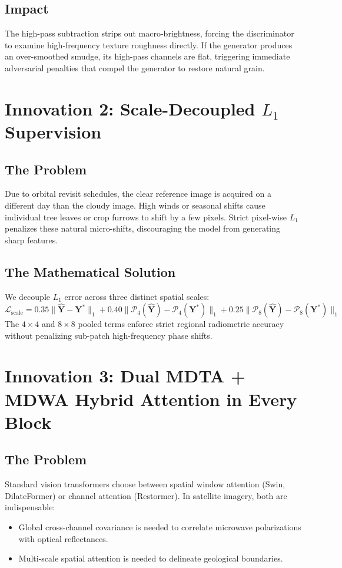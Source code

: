 \subsection{Impact}
The high-pass subtraction strips out macro-brightness, forcing the discriminator to examine high-frequency texture roughness directly. If the generator produces an over-smoothed smudge, its high-pass channels are flat, triggering immediate adversarial penalties that compel the generator to restore natural grain.

\section{Innovation 2: Scale-Decoupled $L_1$ Supervision}
\subsection{The Problem}
Due to orbital revisit schedules, the clear reference image is acquired on a different day than the cloudy image. High winds or seasonal shifts cause individual tree leaves or crop furrows to shift by a few pixels. Strict pixel-wise $L_1$ penalizes these natural micro-shifts, discouraging the model from generating sharp features.

\subsection{The Mathematical Solution}
We decouple $L_1$ error across three distinct spatial scales:
\begin{equation}
\mathcal{L}_{\text{scale}} = 0.35 \|\hat{\mathbf{Y}} - \mathbf{Y}^*\|_1 + 0.40 \|\mathcal{P}_4(\hat{\mathbf{Y}}) - \mathcal{P}_4(\mathbf{Y}^*)\|_1 + 0.25 \|\mathcal{P}_8(\hat{\mathbf{Y}}) - \mathcal{P}_8(\mathbf{Y}^*)\|_1
\end{equation}
The $4\times 4$ and $8\times 8$ pooled terms enforce strict regional radiometric accuracy without penalizing sub-patch high-frequency phase shifts.

\section{Innovation 3: Dual MDTA + MDWA Hybrid Attention in Every Block}
\subsection{The Problem}
Standard vision transformers choose between spatial window attention (Swin, DilateFormer) or channel attention (Restormer). In satellite imagery, both are indispensable:
\begin{itemize}
    \item Global cross-channel covariance is needed to correlate microwave polarizations with optical reflectances.
    \item Multi-scale spatial attention is needed to delineate geological boundaries.
\end{itemize}

